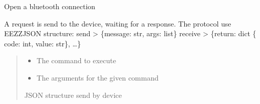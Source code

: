 \documentclass[letterpaper,10pt,english]{sphinxmanual}
\begin{document}
\begin{savenotes}
\begin{fulllineitems}
\begin{savenotes}
\begin{fulllineitems}
\end{fulllineitems}\end{savenotes}


\begin{savenotes}\begin{fulllineitems}
\label{\detokenize{eezz:eezz.blueserv.TBluetoothService.open_connection}}
\pysigstartsignatures
{}
\pysigstopsignatures
\sphinxAtStartPar
Open a bluetooth connection

\end{fulllineitems}\end{savenotes}


\begin{savenotes}\begin{fulllineitems}
\label{\detokenize{eezz:eezz.blueserv.TBluetoothService.send_request}}
\pysigstartsignatures
{}
\pysigstopsignatures
\sphinxAtStartPar
A request is send to the device, waiting for a response.
The protocol use EEZZ\sphinxhyphen{}JSON structure:
send \sphinxhyphen{}\textgreater{}    \{message: str, args: list\}
receive \sphinxhyphen{}\textgreater{} \{return: dict \{ code: int, value: str\}, …\}
\begin{quote}\begin{description}
\begin{itemize}
\item {} 
\sphinxAtStartPar
{} \textendash{} The command to execute

\item {} 
\sphinxAtStartPar
{} \textendash{} The arguments for the given command

\end{itemize}

\sphinxAtStartPar
JSON structure send by device


\end{description}
\end{quote}
\end{fulllineitems}
\end{savenotes}
\end{fulllineitems}
\end{savenotes}
\end{document}
